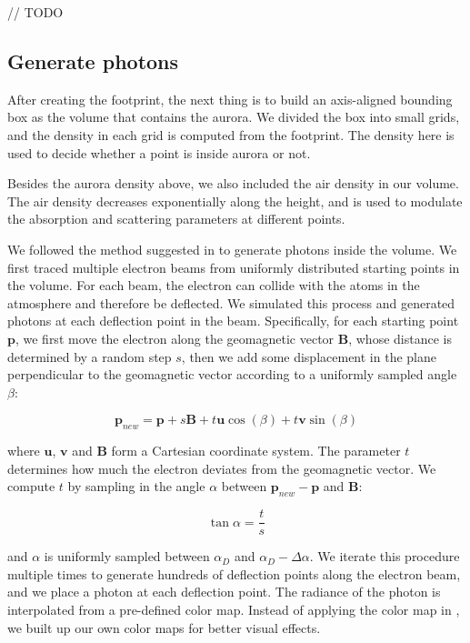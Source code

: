\documentclass[10pt,a4paper]{article}
\begin{document}
//	TODO

\subsection{Generate photons}

After creating the footprint, the next thing is to build an axis-aligned bounding box as the volume that contains the aurora. We divided the box into small grids, and the density in each grid is computed from the footprint. The density here is used to decide whether a point is inside aurora or not.

Besides the aurora density above, we also included the air density in our volume. The air density decreases exponentially along the height, and is used to modulate the absorption and scattering parameters at different points.

We followed the method suggested in \cite{baranoski2000simulating} to generate photons inside the volume. We first traced multiple electron beams from uniformly distributed starting points in the volume. For each beam, the electron can collide with the atoms in the atmosphere and therefore be deflected. We simulated this process and generated photons at each deflection point in the beam. Specifically, for each starting point $\mathbf{p}$, we first move the electron along the geomagnetic vector $\mathbf{B}$, whose distance is determined by a random step $s$, then we add some displacement in the plane perpendicular to the geomagnetic vector according to a uniformly sampled angle $\beta$:

\[
\mathbf{p}_{new} = \mathbf{p} + s\mathbf{B} + t\mathbf{u}\cos(\beta) + t\mathbf{v}\sin(\beta)
\]

where $\mathbf{u}$, $\mathbf{v}$ and $\mathbf{B}$ form a Cartesian coordinate system. The parameter $t$ determines how much the electron deviates from the geomagnetic vector. We compute $t$ by sampling in the angle $\alpha$ between $\mathbf{p}_{new} - \mathbf{p}$ and $\mathbf{B}$:

\[
\tan{\alpha} = \frac{t}{s}
\]

and $\alpha$ is uniformly sampled between $\alpha_D$ and $\alpha_D - \Delta \alpha$. We iterate this procedure multiple times to generate hundreds of deflection points along the electron beam, and we place a photon at each deflection point. The radiance of the photon is interpolated from a pre-defined color map. Instead of applying the color map in \cite{baranoski2000simulating}, we built up our own color maps for better visual effects.
\end{document}
